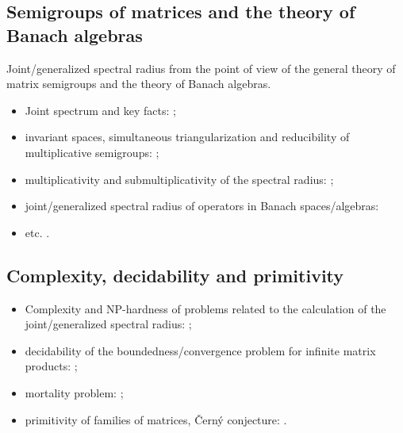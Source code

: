 \documentclass[a4paper,fleqn]{article}
\let\cite=\citep
\begin{document}
\subsection*{Semigroups of matrices and the theory of Banach algebras}
Joint/generalized spectral radius from the point of view of the general
theory of matrix semigroups and the theory of Banach algebras.

\begin{itemize}
  \item Joint spectrum and key facts: \cite{Bell:LAA05, BerWang:LAA92,
          BreSert:LMS21, EE:PAMS04, GurRod:SIAMJMAA97, Lur:LAA06:2, RS:PAMS95,
          Sert:Thesis16, Sert:CRMASP17};
  \item invariant spaces, simultaneous triangularization and reducibility of
        multiplicative semigroups: \cite{Drnov:97, Drnovsek:SM97, Drn:IEOT01,
          GPRSTT:P10, Guinand:PAMS82, HNRRR:HJM91, LMMR:JOT98, OmRadj:LAA97,
          Prot:FPM96:e, Radj:IUMJ90, RRS:PAMS00, Szep:AMH86};
  \item multiplicativity and submultiplicativity of the spectral radius:
        \cite{LR:CJM95, OmRadj:LAA97, ProtVoy:LAA17};
  \item joint/generalized spectral radius of operators in Banach
        spaces/algebras: \cite{BD:StochDyn21, BF:AIF21, Bogdanovic:ArXiv23,
          BP:LMA23, BP:ArXiv24v2, EE:PAMS04, LS:LAA02, KisShulTur:20,
          Morris:JFA12, Muller:APM97, Pep:LMA11, Peperko:LAA12, RS:PAMS95,
          ShulTur:ArXiv12, ShulTur:JFA00, ShulTur:SM02, Turovskii:JFA99,
          TurShul:FAP00, TurShul:FAP12}
  \item etc. \cite{Javaheri:JMAA13, Prot:ArXiv25, ManSim:TCS78}.
\end{itemize}

\subsection*{Complexity, decidability and primitivity}
\begin{itemize}
  \item Complexity and NP-hardness of problems related to the calculation of
        the joint/generalized spectral radius: \cite{AhmJun14, AhmJng:NAHS16,
          AltPar:CDC19, AltPar:SIAMJCO20, BGT:IEEETAC00, BJ:CANT10,
          BJP:IEEETIT06, BN:SIAMJMAA09, BT:Autom00, ChangPhD12, CB:NA13,
          CHJ:SIAMJCO15, HMS:MPCPS13, Jungers:09, PJ:CDC13, Theys:PhD05,
          TB:MCSS97:4, TB:MCSS97:1, Toker:AJIFAC97};
  \item decidability of the boundedness/convergence problem for infinite matrix
        products: \cite{AKKK:92:e, BBKPT:TCS01, BC:TCS03, BT:SCL00,
          CiconePhD11, Cicone:ArXiv15, JPB:LAA08, Koz:AiT90:6:e, Koz:AiT03:9:e,
          Koz:ArXiv13, VlasJung:SCL14};
  \item mortality problem: \cite{BBKPT:TCS01, BT:IPL97, BB:TCS02,
          Saouter:inria96};
  \item primitivity of families of matrices, \v{C}ern\'{y} conjecture:
        \cite{BJO:AJIFAC15, CosJun:LNCS18, CosJun:IJFCS20, ProtVoyn:LAA12,
          Jungers:LAA12}.
\end{itemize}
\end{document}
